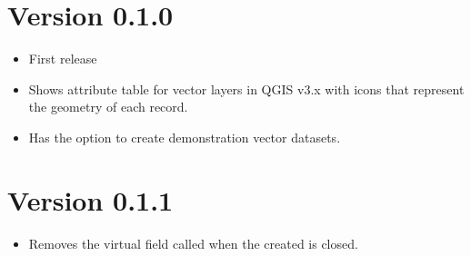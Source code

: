 \documentclass[a4paper,11pt,english]{sphinxmanual}
\begin{document}
\section{Version 0.1.0}
\label{\detokenize{changelog:version-0-1-0}}\begin{itemize}
\item {} 
First release

\item {} 
Shows attribute table for vector layers in QGIS v3.x with icons that represent the geometry of each record.

\item {} 
Has the option to create demonstration vector datasets.

\end{itemize}


\section{Version 0.1.1}
\label{\detokenize{changelog:version-0-1-1}}\begin{itemize}
\item {} 
Removes the virtual field called  when the created  is closed.

\end{itemize}
\end{document}
